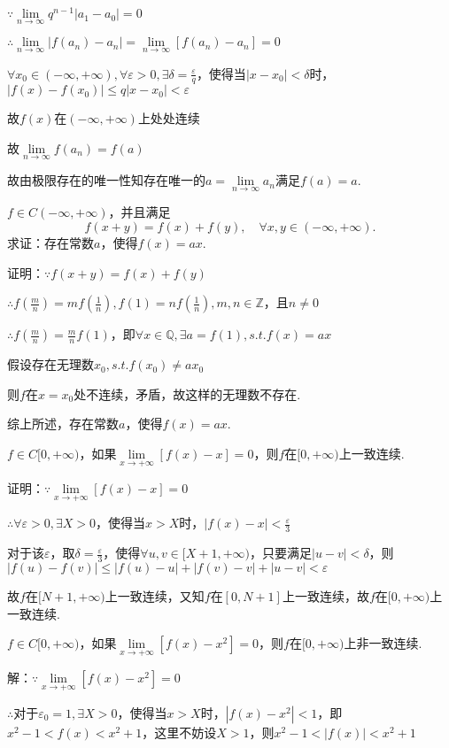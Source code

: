 \documentclass[12pt,UTF8]{ctexart}
\begin{document}
\begin{enumerate}
$\because\lim\limits_{n\rightarrow\infty}q^{n-1}|a_1-a_0|=0$

$\therefore\lim\limits_{n\rightarrow\infty}|f(a_n)-a_n|=\lim\limits_{n\rightarrow\infty}[f(a_n)-a_n]=0$

$\forall x_0\in(-\infty,+\infty),\forall\varepsilon>0,\exists \delta=\frac\varepsilon q$，使得当$|x-x_0|<\delta$时，$|f(x)-f(x_0)|\leq q|x-x_0|<\varepsilon$

故$f(x)$在$(-\infty,+\infty)$上处处连续

故$\lim\limits_{n\rightarrow\infty}f(a_n)=f(a)$

故由极限存在的唯一性知存在唯一的$a=\lim\limits_{n\rightarrow\infty}a_n$满足$f(a)=a$.

$f\in C(-\infty,+\infty)$，并且满足
\[
f(x+y)=f(x)+f(y),\quad\forall x,y\in(-\infty,+\infty).
\]
求证：存在常数$a$，使得$f(x)=ax$.

证明：$\because f(x+y)=f(x)+f(y)$

$\therefore f(\frac mn)=mf(\frac1n),f(1)=nf(\frac1n),m,n\in\mathbb Z$，且$n\neq0$

$\therefore f(\frac mn)=\frac mnf(1)$，即$\forall x\in\mathbb Q,\exists a=f(1),s.t.f(x)=ax$

假设存在无理数$x_0,s.t.f(x_0)\neq ax_0$

则$f$在$x=x_0$处不连续，矛盾，故这样的无理数不存在.

综上所述，存在常数$a$，使得$f(x)=ax$.

$f\in C[0,+\infty)$，如果$\lim\limits_{x\rightarrow+\infty}[f(x)-x]=0$，则$f$在$[0,+\infty)$上一致连续.

证明：$\because\lim\limits_{x\rightarrow+\infty}[f(x)-x]=0$

$\therefore\forall\varepsilon>0,\exists X>0$，使得当$x>X$时，$|f(x)-x|<\frac\varepsilon3$

对于该$\varepsilon$，取$\delta=\frac\varepsilon3$，使得$\forall u,v\in[X+1,+\infty)$，只要满足$|u-v|<\delta$，则$|f(u)-f(v)|\leq|f(u)-u|+|f(v)-v|+|u-v|<\varepsilon$

故$f$在$[N+1,+\infty)$上一致连续，又知$f$在$[0,N+1]$上一致连续，故$f$在$[0,+\infty)$上一致连续.

$f\in C[0,+\infty)$，如果$\lim\limits_{x\rightarrow+\infty}[f(x)-x^2]=0$，则$f$在$[0,+\infty)$上非一致连续.

解：$\because\lim\limits_{x\rightarrow+\infty}[f(x)-x^2]=0$

$\therefore$对于$\varepsilon_0=1,\exists X>0$，使得当$x>X$时，$|f(x)-x^2|<1$，即$x^2-1<f(x)<x^2+1$，这里不妨设$X>1$，则$x^2-1<|f(x)|<x^2+1$


\end{enumerate}
\end{document}
